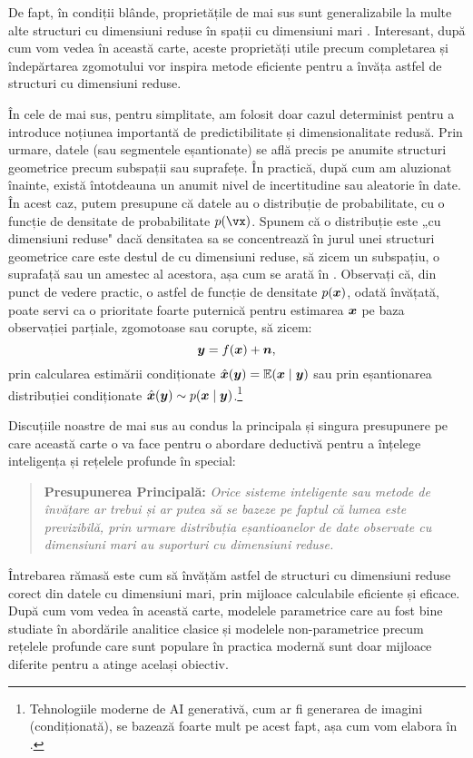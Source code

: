\documentclass[../../book-main_ro.tex]{subfiles}
\begin{document}
De fapt, în condiții blânde, proprietățile de mai sus sunt generalizabile la multe alte structuri cu dimensiuni reduse în spații cu dimensiuni mari \cite{Wright-Ma-2022}. Interesant, după cum vom vedea în această carte, aceste proprietăți utile precum completarea și îndepărtarea zgomotului vor inspira metode eficiente pentru a învăța astfel de structuri cu dimensiuni reduse.

În cele de mai sus, pentru simplitate, am folosit doar cazul determinist pentru a introduce noțiunea importantă de predictibilitate și dimensionalitate redusă. Prin urmare, datele (sau segmentele eșantionate) se află precis pe anumite structuri geometrice precum subspații sau suprafețe. În practică, după cum am aluzionat înainte, există întotdeauna un anumit nivel de incertitudine sau aleatorie în date. În acest caz, putem presupune că datele au o distribuție de probabilitate, cu o funcție de densitate de probabilitate $p(\vx)$. Spunem că o distribuție este „cu dimensiuni reduse" dacă densitatea sa se concentrează în jurul unei structuri geometrice care este destul de cu dimensiuni reduse, să zicem un subspațiu, o suprafață sau un amestec al acestora, așa cum se arată în . Observați că, din punct de vedere practic, o astfel de funcție de densitate $p(\bm{x})$, odată învățată, poate servi ca o prioritate foarte puternică pentru estimarea $\bm{x}$ pe baza observației parțiale, zgomotoase sau corupte, să zicem:
\begin{equation}
\bm{y} = f(\bm{x}) + \boldsymbol{n},
\end{equation}
prin calcularea estimării condiționate $\hat{\bm{x}}(\bm{y}) = \mathbb{E}(\bm{x} \mid \bm{y})$ sau prin eșantionarea distribuției condiționate $\hat{\bm{x}}(\bm{y}) \sim p(\bm{x}\mid \bm{y})$.\footnote{Tehnologiile moderne de AI generativă, cum ar fi generarea de imagini (condiționată), se bazează foarte mult pe acest fapt, așa cum vom elabora în .}

Discuțiile noastre de mai sus au condus la principala și singura presupunere pe care această carte o va face pentru o abordare deductivă pentru a înțelege inteligența și rețelele profunde în special:
\begin{quote}
\textbf{Presupunerea Principală:} {\em Orice sisteme inteligente sau metode de învățare ar trebui și ar putea să se bazeze pe faptul că lumea este previzibilă, prin urmare distribuția eșantioanelor de date observate cu dimensiuni mari au suporturi cu dimensiuni reduse.}
\end{quote}
Întrebarea rămasă este cum să învățăm astfel de structuri cu dimensiuni reduse corect din datele cu dimensiuni mari, prin mijloace calculabile eficiente și eficace. După cum vom vedea în această carte, modelele parametrice care au fost bine studiate în abordările analitice clasice și modelele non-parametrice precum rețelele profunde care sunt populare în practica modernă sunt doar mijloace diferite pentru a atinge același obiectiv.
\end{document}
